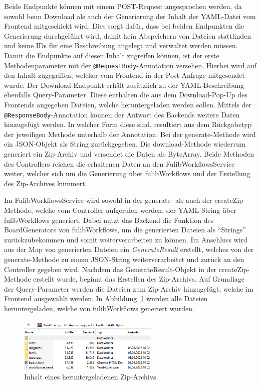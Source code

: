 Beide Endpunkte können mit einem POST-Request angesprochen werden, da sowohl beim Download als auch der Generierung der Inhalt der
YAML-Datei vom Frontend mitgeschickt wird.
Dies sorgt dafür, dass bei beiden Endpunkten die Generierung durchgeführt wird, damit kein Abspeichern von Dateien stattfinden und keine IDs für
eine Beschreibung angelegt und verwaltet werden müssen.
Damit die Endpunkte auf diesen Inhalt zugreifen können, ist der erste Methodenparameter mit der \texttt{@RequestBody}-Annotation versehen.
Hierbei wird auf den Inhalt zugegriffen, welcher vom Frontend in der Post-Anfrage mitgesendet wurde.
Der Download-Endpunkt erhält zusätzlich zu der YAML-Beschreibung ebenfalls Query-Parameter.
Diese enthalten die aus dem Download-Pop-Up des Frontends angegeben Dateien, welche heruntergeladen werden sollen.
Mittels der \texttt{@ResponseBody}-Annotation können der Antwort des Backends weitere Daten hinzugefügt werden.
In welcher Form diese sind, resultiert aus dem Rückgabetyp der jeweiligen Methode unterhalb der Annotation.
Bei der generate-Methode wird ein JSON-Objekt als String zurückgegeben.
Die download-Methode wiederrum generiert ein Zip-Archiv und versendet die Daten als ByteArray.
Beide Methoden des Controllers reichen die erhaltenen Daten an den FulibWorkflowsService weiter, welcher sich um die Generierung über fulibWorkflows
und der Erstellung des Zip-Archives kümmert.

Im FulibWorkflowsService wird sowohl in der generate- als auch der createZip-Methode, welche vom Controller aufgerufen werden,
der YAML-String über fulibWorkflows generiert.
Dabei nutzt das Backend die Funktion des BoardGenerators von fulibWorkflows, um die generierten Dateien als ``Strings'' zurückzubekommen und somit weiterverarbeiten zu können.
Im Anschluss wird aus der Map von generierten Dateien ein \textit{GenerateResult} erstellt, welches von der generate-Methode zu einem JSON-String weiterverarbeitet und zurück an den Controller gegeben wird.
Nachdem das GenerateResult-Objekt in der createZip-Methode erstellt wurde, beginnt das Erstellen des Zip-Archivs.
Auf Grundlage der Query-Parameter werden die Dateien zum Zip-Archiv hinzugefügt, welche im Frontend ausgewählt werden.
In Abbildung~\ref{fig:export} wurden alle Dateien heruntergeladen, welche von fulibWorkflows generiert wurden.

\begin{figure}[h]
    \centering
    \includegraphics[width=0.6\textwidth]{images/3.3/export}
    \caption{Inhalt eines heruntergeladenen Zip-Archivs}
    \label{fig:export}
\end{figure}

